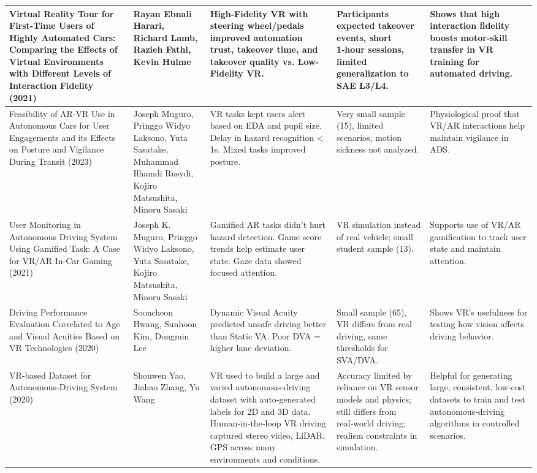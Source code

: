 {\begin{longtable}{|p{}|p{}|>{\raggedright\arraybackslash}p{}|>{\raggedright\arraybackslash}p{}|>{\raggedright\arraybackslash}p{}|}
\hline
\endlastfoot
Virtual Reality Tour for First-Time Users of Highly Automated Cars: Comparing the Effects of Virtual Environments with Different Levels of Interaction Fidelity (2021)~\cite{Harari2021} & Rayan Ebnali Harari, Richard Lamb, Razieh Fathi, Kevin Hulme & High-Fidelity VR with steering wheel/pedals improved automation trust, takeover time, and takeover quality vs. Low-Fidelity VR. & Participants expected takeover events, short 1‑hour sessions, limited generalization to SAE L3/L4. & Shows that high interaction fidelity boosts motor‑skill transfer in VR training for automated driving. \\ \hline
Feasibility of AR-VR Use in Autonomous Cars for User Engagements and its Effects on Posture and Vigilance During Transit (2023)~\cite{Muguro2023} & Joseph Muguro, Pringgo Widyo Laksono, Yuta Sasatake, Muhammad Ilhamdi Rusydi, Kojiro Matsushita, Minoru Sasaki & VR tasks kept users alert based on EDA and pupil size. Delay in hazard recognition < 1s. Mixed tasks improved posture. & Very small sample (15), limited scenarios, motion sickness not analyzed. & Physiological proof that VR/AR interactions help maintain vigilance in ADS. \\ \hline
User Monitoring in Autonomous Driving System Using Gamified Task: A Case for VR/AR In-Car Gaming (2021)~\cite{Muguro2021} & Joseph K. Muguro, Pringgo Widyo Laksono, Yuta Sasatake, Kojiro Matsushita, Minoru Sasaki & Gamified AR tasks didn’t hurt hazard detection. Game score trends help estimate user state. Gaze data showed focused attention. & VR simulation instead of real vehicle; small student sample (13). & Supports use of VR/AR gamification to track user state and maintain attention. \\ \hline
Driving Performance Evaluation Correlated to Age and Visual Acuities Based on VR Technologies (2020)~\cite{Hwang2020} & Sooncheon Hwang, Sunhoon Kim, Dongmin Lee & Dynamic Visual Acuity predicted unsafe driving better than Static VA. Poor DVA = higher lane deviation. & Small sample (65), VR differs from real driving, same thresholds for SVA/DVA. & Shows VR’s usefulness for testing how vision affects driving behavior. \\ \hline
VR‑based Dataset for Autonomous‑Driving System (2020)~\cite{Yao2020} & Shouwen Yao, Jiahao Zhang, Yu Wang & VR used to build a large and varied autonomous‑driving dataset with auto‑generated labels for 2D and 3D data. Human‑in‑the‑loop VR driving captured stereo video, LiDAR, GPS across many environments and conditions. & Accuracy limited by reliance on VR sensor models and physics; still differs from real‑world driving; realism constraints in simulation. & Helpful for generating large, consistent, low‑cost datasets to train and test autonomous‑driving algorithms in controlled scenarios. \\ \hline

\end{longtable}}

